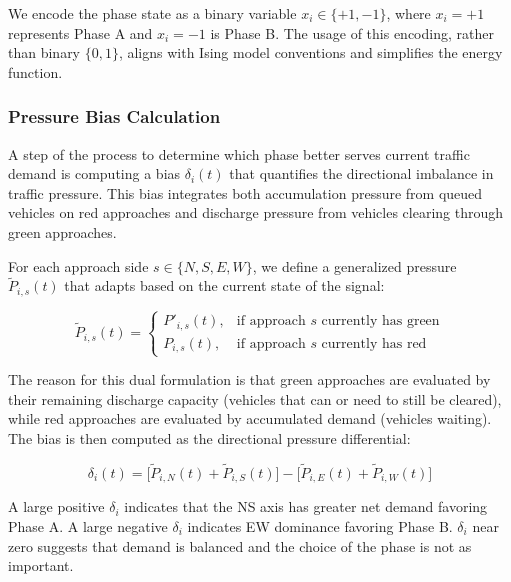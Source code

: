 \documentclass[12pt]{article}
\begin{document}
We encode the phase state as a binary variable $x_{i} \in \{+1, -1\}$, where $x_{i} = +1$ represents Phase A and $x_{i} = -1$ is Phase B. The usage of this encoding, rather than binary $\{0, 1\}$, aligns with Ising model conventions and simplifies the energy function.

\subsubsection{Pressure Bias Calculation}

A step of the process to determine which phase better serves current traffic demand is computing a bias \(\delta_{i}(t)\) that quantifies the directional imbalance in traffic pressure. This bias integrates both accumulation pressure from queued vehicles on red approaches and discharge pressure from vehicles clearing through green approaches.

For each approach side $s \in \{N, S, E, W\}$, we define a generalized pressure $\tilde{P}_{i,s}(t) $ that adapts based on the current state of the signal:

\begin{equation}
\label{eq:generalized_press}
    \tilde{P}_{i,s}(t) = \begin{cases} P'_{i,s}(t), & \text{if approach } s \text{ currently has green} \\ P_{i,s}(t), & \text{if approach } s \text{ currently has red} \end{cases}
\end{equation}



The reason for this dual formulation is that green approaches are evaluated by their remaining discharge capacity (vehicles that can or need to still be cleared), while red approaches are evaluated by accumulated demand (vehicles waiting). The bias is then computed as the directional pressure differential:

\begin{equation}
\label{eq:delta}
    \delta_i(t) = \Big[\tilde{P}_{i,N}(t) + \tilde{P}_{i,S}(t)\Big] - \Big[\tilde{P}_{i,E}(t) + \tilde{P}_{i,W}(t)\Big]
\end{equation}



A large positive \(\delta_{i}\) indicates that the NS axis has greater net demand favoring Phase A. A large negative \(\delta_{i}\) indicates EW dominance favoring Phase B. \(\delta_{i}\) near zero suggests that demand is balanced and the choice of the phase is not as important.
\end{document}
